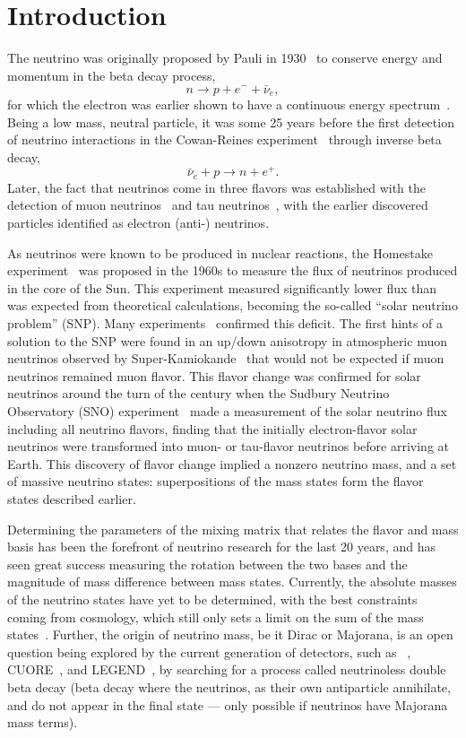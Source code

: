 \chapter{Introduction}
The neutrino was originally proposed by Pauli in 1930~\cite{pauli} to conserve energy and momentum in the beta decay process,
\begin{equation}
n \rightarrow p + e^- + \bar{\nu}_e,
\end{equation}
for which the electron was earlier shown to have a continuous energy spectrum~\cite{chadwick}.
Being a low mass, neutral particle, it was some 25 years before the first detection of neutrino interactions in the Cowan-Reines experiment~\cite{cowan-reines} through inverse beta decay,
\begin{equation}
\bar{\nu}_e + p \rightarrow n + e^+.
\end{equation}
Later, the fact that neutrinos come in three flavors was established with the detection of muon neutrinos~\cite{danby} and tau neutrinos~\cite{donut}, with the earlier discovered particles identified as electron (anti-) neutrinos.

As neutrinos were known to be produced in nuclear reactions, the Homestake experiment~\cite{homestake} was proposed in the 1960s to measure the flux of neutrinos produced in the core of the Sun.
This experiment measured significantly lower flux than was expected from theoretical calculations, becoming the so-called ``solar neutrino problem'' (SNP).
Many experiments~\cite{sage,gallex,gno} confirmed this deficit.
The first hints of a solution to the SNP were found in an up/down anisotropy in atmospheric muon neutrinos observed by Super-Kamiokande~\cite{superk} that would not be expected if muon neutrinos remained muon flavor. 
This flavor change was confirmed for solar neutrinos around the turn of the century when the Sudbury Neutrino Observatory (SNO) experiment~\cite{3phase} made a measurement of the solar neutrino flux including all neutrino flavors, finding that the initially electron-flavor solar neutrinos were transformed into muon- or tau-flavor neutrinos before arriving at Earth.
This discovery of flavor change implied a nonzero neutrino mass, and a set of massive neutrino states: superpositions of the mass states form the flavor states described earlier.

Determining the parameters of the mixing matrix that relates the flavor and mass basis has been the forefront of neutrino research for the last 20 years, and has seen great success measuring the rotation between the two bases and the magnitude of mass difference between mass states. 
Currently, the absolute masses of the neutrino states have yet to be determined, with the best constraints coming from cosmology, which still only sets a limit on the sum of the mass states~\cite{pdg}.
Further, the origin of neutrino mass, be it Dirac or Majorana, is an open question being explored by the current generation of detectors, such as {\snop}~\cite{snop}, CUORE~\cite{cuore}, and LEGEND~\cite{legend}, by searching for a process called neutrinoless double beta decay (beta decay where the neutrinos, as their own antiparticle annihilate, and do not appear in the final state --- only possible if neutrinos have Majorana mass terms).

